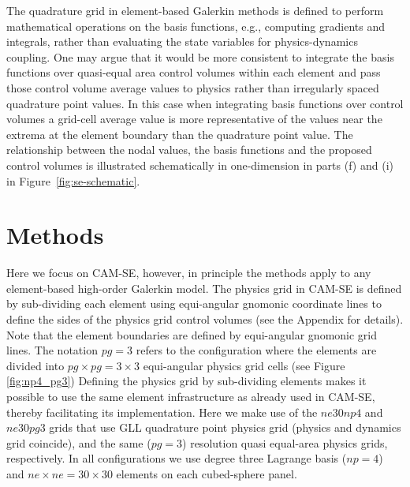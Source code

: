 \documentclass[twocol]{ametsoc}
\begin{document}
The quadrature grid in element-based Galerkin methods is defined to perform mathematical operations on the basis functions, e.g., computing gradients and integrals, rather than evaluating the state variables for physics-dynamics coupling. One may argue that it would be more consistent to integrate the basis functions over quasi-equal area control volumes within each element and pass those control volume average values to physics rather than irregularly spaced quadrature point values. In this case when integrating basis functions over control volumes a grid-cell average value is more representative of the values near the extrema at the element boundary than the quadrature point value. The relationship between the nodal values, the basis functions and the proposed control volumes is illustrated schematically in one-dimension in parts (f) and (i) in Figure~\ref{fig:se-schematic}. 

\section{Methods}\label{sec:methods}
Here we focus on CAM-SE, however, in principle the methods apply to any element-based high-order Galerkin model. The physics grid in CAM-SE is defined by sub-dividing each element using equi-angular gnomonic coordinate lines to define the sides of the physics grid control volumes (see the Appendix for details). Note that the element boundaries are defined by equi-angular gnomonic grid lines. The notation $pg=3$ refers to the configuration where the elements are divided into $pg\times pg=3\times 3$ equi-angular physics grid cells (see Figure \ref{fig:np4_pg3}) {\color{red}{resulting in a quasi-equal spherical area grid.}} Defining the physics grid by sub-dividing elements makes it possible to use the same element infrastructure as already used in CAM-SE, thereby facilitating its implementation. Here we make use of the $ne30np4$ and $ne30pg3$ grids that use GLL quadrature point physics grid (physics and dynamics grid coincide), and the same ($pg=3$) resolution quasi equal-area physics grids, respectively. In all configurations we use degree three Lagrange basis ($np=4$) and $ne\times ne=30\times 30$ elements on each cubed-sphere panel.
\end{document}
